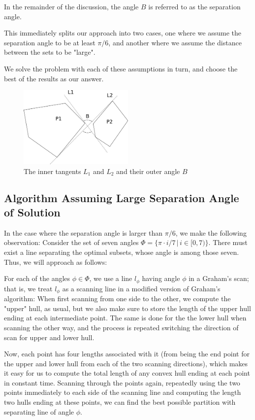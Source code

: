 \documentclass{article}
\begin{document}
In the remainder of the discussion, the angle $B$ is referred to as the separation angle.

This immediately splits our approach into two cases, one where we assume the separation angle to be at least $\pi / 6$, and another where we assume the distance between the sets to be "large". 


We solve the problem with each of these assumptions in turn, and choose the best of the results as our answer.


\begin{figure}[ht]
    \centering
    \includegraphics[width=0.5\textwidth]{images/inner_angle.png}
    \caption{The inner tangents $L_1$ and $L_2$ and their outer angle $B$}
    \label{fig:tangent_angle}
\end{figure}


\subsection{Algorithm Assuming Large Separation Angle of Solution}

In the case where the separation angle is larger than $\pi / 6$, we make the following observation: Consider the set of seven angles $\Phi = \{\pi \cdot i / 7 \,  | \, i \in [0, 7) \}$. There must exist a line separating the optimal subsets, whose angle is among those seven. Thus, we will approach as follows:

For each of the angles $\phi \in \Phi$, we use a line $l_\phi$ having angle $\phi$ in a Graham's scan; that is, we treat $l_\phi$ as a scanning line in a modified version of Graham's algorithm: When first scanning from one side to the other, we compute the "upper" hull, as usual, but we also make sure to store the length of the upper hull ending at each intermediate point. The same is done for the the lower hull when scanning the other way, and the process is repeated switching the direction of scan for upper and lower hull. 

Now, each point has four lengths associated with it (from being the end point for the upper and lower hull from each of the two scanning directions), which makes it easy for us to compute the total length of any convex hull ending at each point in constant time. Scanning through the points again, repeatedly using the two points immediately to each side of the scanning line and computing the length two hulls ending at these points, we can find the best possible partition with separating line of angle $\phi$.
\end{document}
